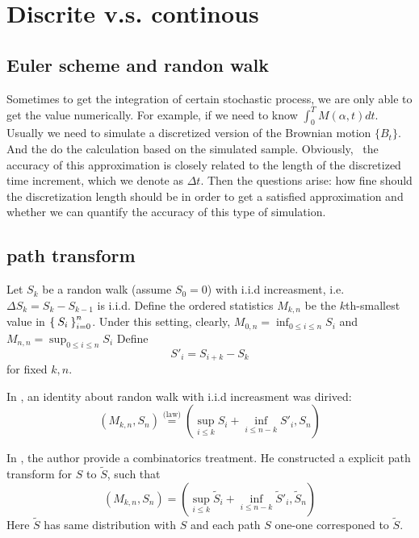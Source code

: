\documentclass[11pt]{book}
\def\eqlaw{{\stackrel{\text{(law)}}{=}}}
\def\tS{{\widetilde{S}}}
\begin{document}
 
\section{Discrite v.s. continous}
\subsection{Euler scheme and randon walk}
Sometimes to get the integration of certain stochastic process, we are only able to get the value numerically. For example, if we need to know $\int^T_{0} M(\alpha , t)dt$. Usually we need to simulate a discretized version of the Brownian motion $\{B_t\}$. And the do the calculation based on the simulated sample. Obviously,  the accuracy of this approximation is closely related to the length of the discretized time increment, which we denote as $\Delta t$. Then the questions arise: how fine should the discretization length should be in order to get a satisfied approximation and whether we can quantify the accuracy of this type of simulation. 





\subsection{path transform}
Let $S_k$ be a randon walk (assume $S_0=0$)
with i.i.d increasment, i.e.
$\Delta S_k = S_k -  S_{k-1}$ is i.i.d.
Define the ordered statistics $M_{k,n}$ be the $k$th-smallest value in
$\Set{S_i}_{i=0}^n$.
Under this setting, clearly, $M_{0,n} = \inf_{0\leq i\leq n}S_i$
and $M_{n,n} = \sup_{0\leq i\leq n}S_i$
Define
\[S'_i = S_{i+k}-S_k\]
for fixed $k, n$.

In \cite{Wendel1960}, an identity about randon walk with
i.i.d increasment was dirived:
\begin{equation}\label{eq:dpathdec}
(M_{k,n}, S_n) \eqlaw (\sup_{i\leq k} S_i +\inf_{i\leq n-k} S'_i, S_n)
\end{equation}

In \cite{Chaumont1999}, the author provide a combinatorics treatment.
He constructed a explicit path transform for $S$ to $\tS$, such that
\[
(M_{k,n}, S_n) = (\sup_{i\leq k} \tS_i+\inf_{i\leq n-k} \tS'_i, \tS_n)
\]
Here $\tS$ has same distribution with $S$ and each path $S$
 one-one corresponed to $\tS$.
\end{document}

